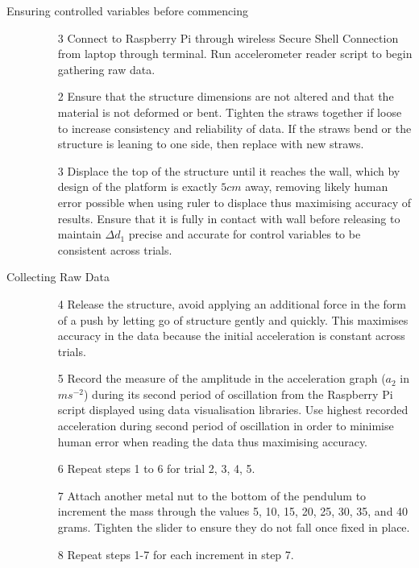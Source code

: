\documentclass[11pt]{article}
\begin{document}
\begin{description}
    \item [Ensuring controlled variables before commencing] \phantom{.}
    \begin{itemize}
        \item [3] Connect to Raspberry Pi through wireless Secure Shell Connection from laptop through terminal. Run accelerometer reader script to begin gathering raw data.
        \item [2] Ensure that the structure dimensions are not altered and that the material is not deformed or bent. Tighten the straws together if loose to increase consistency and reliability of data. If the straws bend or the structure is leaning to one side, then replace with new straws.
        \item [3] Displace the top of the structure until it reaches the wall, which by design of the platform is exactly $5cm$ away, removing likely human error possible when using ruler to displace thus maximising accuracy of results. Ensure that it is fully in contact with wall before releasing to maintain $\Delta d_1$ precise and accurate for control variables to be consistent across trials.
    \end{itemize}
    \item [Collecting Raw Data] \phantom{.}
    \begin{itemize}
        \item [4] Release the structure, avoid applying an additional force in the form of a push by letting go of structure gently and quickly. This maximises accuracy in the data because the initial acceleration is constant across trials.
        \item [5] Record the measure of the amplitude in the acceleration graph ($a_2$ in $ms^{-2}$) during its second period of oscillation from the Raspberry Pi script displayed using data visualisation libraries. Use highest recorded acceleration during second period of oscillation in order to minimise human error when reading the data thus maximising accuracy.
        \item [6] Repeat steps 1 to 6 for trial 2, 3, 4, 5.
        \item [7] Attach another metal nut to the bottom of the pendulum to increment the mass through the values 5, 10, 15, 20, 25, 30, 35, and 40 grams. Tighten the slider to ensure they do not fall once fixed in place.
        \item [8] Repeat steps 1-7 for each increment in step 7.
    \end{itemize}
\end{description}
\end{document}
